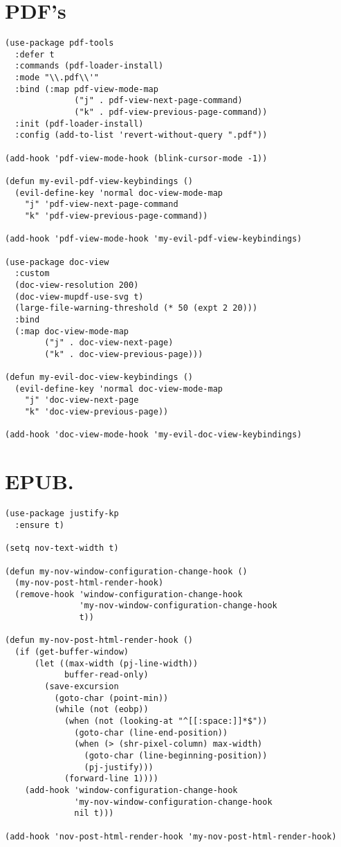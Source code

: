 \documentclass[11pt]{article}
\begin{document}
\section{PDF's}
\label{sec:org6138859}
\begin{verbatim}
(use-package pdf-tools
  :defer t
  :commands (pdf-loader-install)
  :mode "\\.pdf\\'"
  :bind (:map pdf-view-mode-map
              ("j" . pdf-view-next-page-command)
              ("k" . pdf-view-previous-page-command))
  :init (pdf-loader-install)
  :config (add-to-list 'revert-without-query ".pdf"))

(add-hook 'pdf-view-mode-hook (blink-cursor-mode -1))

(defun my-evil-pdf-view-keybindings ()
  (evil-define-key 'normal doc-view-mode-map
    "j" 'pdf-view-next-page-command
    "k" 'pdf-view-previous-page-command))

(add-hook 'pdf-view-mode-hook 'my-evil-pdf-view-keybindings)

(use-package doc-view
  :custom
  (doc-view-resolution 200)
  (doc-view-mupdf-use-svg t)
  (large-file-warning-threshold (* 50 (expt 2 20)))
  :bind
  (:map doc-view-mode-map
        ("j" . doc-view-next-page)
        ("k" . doc-view-previous-page)))

(defun my-evil-doc-view-keybindings ()
  (evil-define-key 'normal doc-view-mode-map
    "j" 'doc-view-next-page
    "k" 'doc-view-previous-page))

(add-hook 'doc-view-mode-hook 'my-evil-doc-view-keybindings)
\end{verbatim}
\section{EPUB.}
\label{sec:org9b3870c}
\begin{verbatim}
(use-package justify-kp
  :ensure t)

(setq nov-text-width t)

(defun my-nov-window-configuration-change-hook ()
  (my-nov-post-html-render-hook)
  (remove-hook 'window-configuration-change-hook
               'my-nov-window-configuration-change-hook
               t))

(defun my-nov-post-html-render-hook ()
  (if (get-buffer-window)
      (let ((max-width (pj-line-width))
            buffer-read-only)
        (save-excursion
          (goto-char (point-min))
          (while (not (eobp))
            (when (not (looking-at "^[[:space:]]*$"))
              (goto-char (line-end-position))
              (when (> (shr-pixel-column) max-width)
                (goto-char (line-beginning-position))
                (pj-justify)))
            (forward-line 1))))
    (add-hook 'window-configuration-change-hook
              'my-nov-window-configuration-change-hook
              nil t)))

(add-hook 'nov-post-html-render-hook 'my-nov-post-html-render-hook)
\end{verbatim}
\end{document}
